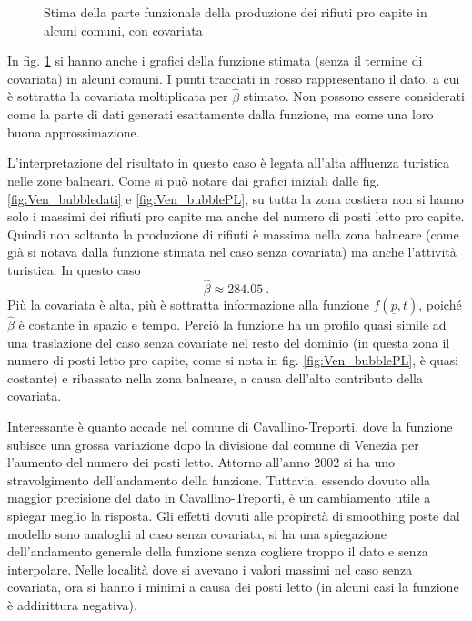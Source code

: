 \documentclass[a4paper,11pt,twoside,openright]{book}							%
\begin{document}
\begin{figure}[t]
{   }
	\caption{Stima della parte funzionale della produzione dei rifiuti pro capite in alcuni comuni, con covariata}
	\label{fig:Vencovar_tempo}
\end{figure}
\newpage
In fig. \ref{fig:Vencovar_tempo} si hanno anche i grafici della funzione stimata (senza il termine di covariata) in alcuni comuni. I punti tracciati in rosso rappresentano il dato, a cui è sottratta la covariata moltiplicata per $\hat{\beta}$ stimato. Non possono essere considerati come la parte di dati generati esattamente dalla funzione, ma come una loro buona approssimazione.

L'interpretazione del risultato in questo caso è legata all'alta affluenza turistica nelle zone balneari. Come si può notare dai grafici iniziali dalle fig. \ref{fig:Ven_bubbledati} e \ref{fig:Ven_bubblePL}, su tutta la zona costiera non si hanno solo i massimi dei rifiuti pro capite ma anche del numero di posti letto pro capite. Quindi non soltanto la produzione di rifiuti è massima nella zona balneare (come già si notava dalla funzione stimata nel caso senza covariata) ma anche l'attività turistica. In questo caso
$$
\hat{\beta}\approx284.05 \ .
$$
Più la covariata è alta, più è sottratta informazione alla funzione $f(\underline p,t)$, poiché $\hat{\beta}$ è costante in spazio e tempo. Perciò la funzione ha un profilo quasi simile ad una traslazione del caso senza covariate nel resto del dominio (in questa zona il numero di posti letto pro capite, come si nota in fig. \ref{fig:Ven_bubblePL}, è quasi costante) e ribassato nella zona balneare, a causa dell'alto contributo della covariata.

Interessante è quanto accade nel comune di Cavallino-Treporti, dove la funzione subisce una grossa variazione dopo la divisione dal comune di Venezia per l'aumento del numero dei posti letto. Attorno all'anno 2002 si ha uno stravolgimento dell'andamento della funzione. Tuttavia, essendo dovuto alla maggior precisione del dato in Cavallino-Treporti, è un cambiamento utile a spiegar meglio la risposta. Gli effetti dovuti alle propiretà di smoothing poste dal modello sono analoghi al caso senza covariata, si ha una spiegazione dell'andamento generale della funzione senza cogliere troppo il dato e senza interpolare. Nelle località dove si avevano i valori massimi nel caso senza covariata, ora si hanno i minimi a causa dei posti letto (in alcuni casi la funzione è addirittura negativa).
\end{document}
